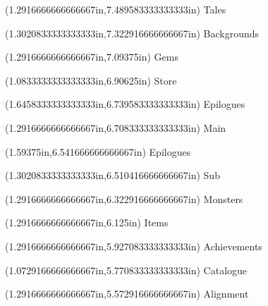 \documentclass{article}
\begin{document}
\begin{textblock*}{8.0in}(1.2916666666666667in,7.489583333333333in)
\fontsize{10.50}{12.60}\selectfont
Tales
\end{textblock*}
\begin{textblock*}{8.0in}(1.3020833333333333in,7.322916666666667in)
\fontsize{12.75}{15.30}\selectfont
Backgrounds
\end{textblock*}
\begin{textblock*}{8.0in}(1.2916666666666667in,7.09375in)
\fontsize{10.50}{12.60}\selectfont
Gems
\end{textblock*}
\begin{textblock*}{8.0in}(1.0833333333333333in,6.90625in)
\fontsize{10.50}{12.60}\selectfont
Store
\end{textblock*}
\begin{textblock*}{8.0in}(1.6458333333333333in,6.739583333333333in)
\fontsize{12.75}{15.30}\selectfont
Epilogues
\end{textblock*}
\begin{textblock*}{8.0in}(1.2916666666666667in,6.708333333333333in)
\fontsize{10.50}{12.60}\selectfont
Main
\end{textblock*}
\begin{textblock*}{8.0in}(1.59375in,6.541666666666667in)
\fontsize{12.75}{15.30}\selectfont
Epilogues
\end{textblock*}
\begin{textblock*}{8.0in}(1.3020833333333333in,6.510416666666667in)
\fontsize{10.50}{12.60}\selectfont
Sub
\end{textblock*}
\begin{textblock*}{8.0in}(1.2916666666666667in,6.322916666666667in)
\fontsize{10.50}{12.60}\selectfont
Monsters
\end{textblock*}
\begin{textblock*}{8.0in}(1.2916666666666667in,6.125in)
\fontsize{10.50}{12.60}\selectfont
Items
\end{textblock*}
\begin{textblock*}{8.0in}(1.2916666666666667in,5.927083333333333in)
\fontsize{10.50}{12.60}\selectfont
Achievements
\end{textblock*}
\begin{textblock*}{8.0in}(1.0729166666666667in,5.770833333333333in)
\fontsize{12.75}{15.30}\selectfont
Catalogue
\end{textblock*}
\begin{textblock*}{8.0in}(1.2916666666666667in,5.572916666666667in)
\fontsize{12.75}{15.30}\selectfont
Alignment
\end{textblock*}
\end{document}
